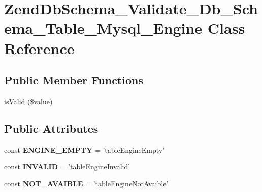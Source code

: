 \hypertarget{classZendDbSchema__Validate__Db__Schema__Table__Mysql__Engine}{\section{\-Zend\-Db\-Schema\-\_\-\-Validate\-\_\-\-Db\-\_\-\-Schema\-\_\-\-Table\-\_\-\-Mysql\-\_\-\-Engine \-Class \-Reference}
\label{classZendDbSchema__Validate__Db__Schema__Table__Mysql__Engine}
}
\subsection*{\-Public \-Member \-Functions}
\begin{DoxyCompactItemize}
\item 
\hyperlink{classZendDbSchema__Validate__Db__Schema__Table__Mysql__Engine_aaa4950844a26ade073c1ffcee79d9c14}{is\-Valid} (\$value)
\end{DoxyCompactItemize}
\subsection*{\-Public \-Attributes}
\begin{DoxyCompactItemize}
\item 
\hypertarget{classZendDbSchema__Validate__Db__Schema__Table__Mysql__Engine_a8d09914de8e85524915de80e63bb4843}{const {\bfseries \-E\-N\-G\-I\-N\-E\-\_\-\-E\-M\-P\-T\-Y} = 'table\-Engine\-Empty'}\label{classZendDbSchema__Validate__Db__Schema__Table__Mysql__Engine_a8d09914de8e85524915de80e63bb4843}

\item 
\hypertarget{classZendDbSchema__Validate__Db__Schema__Table__Mysql__Engine_af94957eb1b50cbb09c058a1a2d50988f}{const {\bfseries \-I\-N\-V\-A\-L\-I\-D} = 'table\-Engine\-Invalid'}\label{classZendDbSchema__Validate__Db__Schema__Table__Mysql__Engine_af94957eb1b50cbb09c058a1a2d50988f}

\item 
\hypertarget{classZendDbSchema__Validate__Db__Schema__Table__Mysql__Engine_accc37a98068ab6c3ad8e9510ea60d750}{const {\bfseries \-N\-O\-T\-\_\-\-A\-V\-A\-I\-B\-L\-E} = 'table\-Engine\-Not\-Avaible'}\label{classZendDbSchema__Validate__Db__Schema__Table__Mysql__Engine_accc37a98068ab6c3ad8e9510ea60d750}

\end{DoxyCompactItemize}
